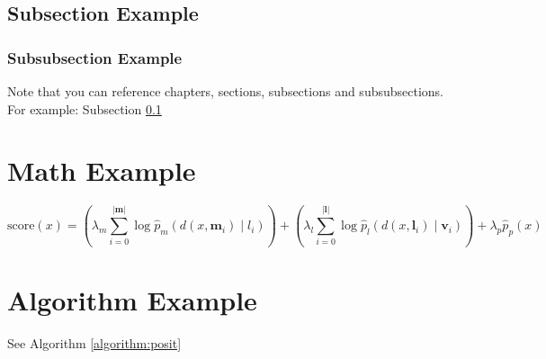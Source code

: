 \subsection{Subsection Example}
\label{subsection:example}
\lipsum[1]
\subsubsection{Subsubsection Example}

Note that you can reference chapters, sections, subsections and subsubsections. For example: Subsection \ref{subsection:example}

\section{Math Example}

\begin{equation}
\textrm{score}(x) = \left(\lambda_m\sum_{i=0}^{|\mathbf{m}|} \log \hat{p}_m(d(x, \mathbf{m}_i) \mid l_i)\right) + \left(\lambda_l\sum_{i=0}^{|\mathbf{l}|} \log\hat{p}_l(d(x, \mathbf{l}_i) \mid \mathbf{v}_i)\right) + \lambda_p \hat{p}_p(x)
\end{equation}

\section{Algorithm Example}

See Algorithm \ref{algorithm:posit}

